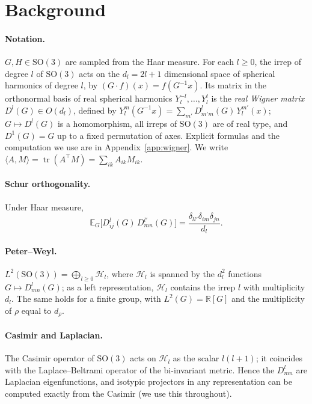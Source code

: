 \documentclass[a4paper,11pt]{article}
\theoremstyle{remark}
\theoremstyle{definition}
\newcommand{\R}{\mathbb{R}}
\newcommand{\E}{\mathbb{E}}
\newcommand{\tr}{\operatorname{tr}}
\newcommand{\SO}{\mathrm{SO}(3)}
\newcommand{\ip}[2]{\langle #1, #2 \rangle}
\begin{document}
\section{Background}

\paragraph{Notation.} $G,H\in\SO$ are sampled from the Haar measure. For each
$l\ge0$, the irrep of degree $l$ of $\SO$ acts on the $d_l=2l+1$ dimensional space
of spherical harmonics of degree $l$, by $(G\cdot f)(x)=f(G^{-1}x)$. Its matrix in
the orthonormal basis of real spherical harmonics $Y_l^{-l},\dots,Y_l^{l}$ is the
\emph{real Wigner matrix} $D^l(G)\in O(d_l)$, defined by
$Y_l^m(G^{-1}x)=\sum_{m'}D^l_{m'm}(G)\,Y_l^{m'}(x)$; $G\mapsto D^l(G)$ is a
homomorphism, all irreps of $\SO$ are of real type, and $D^1(G)=G$ up to a fixed
permutation of axes. Explicit formulas and the computation we use are in
Appendix~\ref{app:wigner}. We write $\ip{A}{M}=\tr(A^\top M)=\sum_{ik}A_{ik}M_{ik}$.

\paragraph{Schur orthogonality.} Under Haar measure,
\begin{equation}\label{eq:schur}
\E_G\bigl[D^l_{ij}(G)\,D^{l'}_{mn}(G)\bigr]=\frac{\delta_{ll'}\delta_{im}\delta_{jn}}{d_l}.
\end{equation}

\paragraph{Peter--Weyl.} $L^2(\SO)=\bigoplus_{l\ge0}\mathcal{H}_l$, where
$\mathcal{H}_l$ is spanned by the $d_l^2$ functions $G\mapsto D^l_{mn}(G)$;
as a left representation, $\mathcal{H}_l$ contains the irrep $l$ with
multiplicity $d_l$. The same holds for a finite group, with $L^2(G)=\R[G]$
and the multiplicity of $\rho$ equal to $d_\rho$.

\paragraph{Casimir and Laplacian.} The Casimir operator of $\SO$ acts on
$\mathcal{H}_l$ as the scalar $l(l+1)$; it coincides with the
Laplace--Beltrami operator of the bi-invariant metric. Hence the $D^l_{mn}$ are
Laplacian eigenfunctions, and isotypic projectors in any representation can be
computed exactly from the Casimir (we use this throughout).
\end{document}
